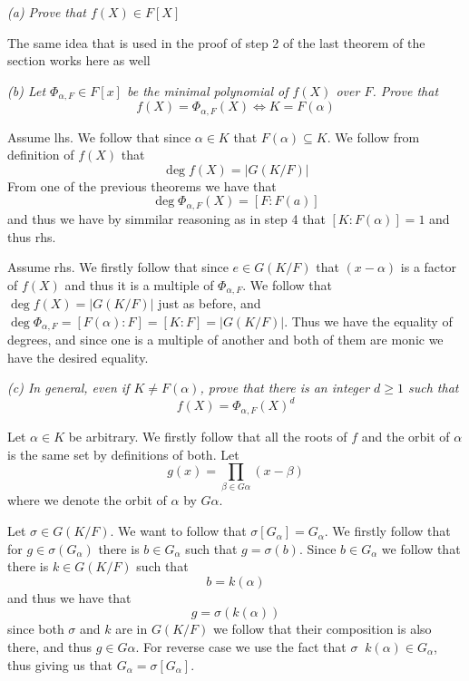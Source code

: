 \documentclass[11pt,oneside,titlepage]{book}
\DeclareMathOperator \inv {^{-1}}
\begin{document}
\textit{(a) Prove that $f(X) \in F[X]$}

The same idea that is used in the proof of step 2 of the last theorem
of the section works here as well

\textit{(b) Let $\Phi_{\alpha, F} \in F[x]$ be the minimal polynomial
  of $f(X)$ over $F$.  Prove that
  $$f(X) = \Phi_{\alpha, F}(X) \iff K = F(\alpha)$$
}

Assume lhs. We follow that since $\alpha \in K$ that $F(\alpha)
\subseteq K$. We follow from definition of $f(X)$ that
$$\deg f(X) = |G(K/F)|$$
From one of the previous theorems we have that
$$\deg \Phi_{\alpha, F}(X) = [F: F(a)]$$
 and thus we have by simmilar reasoning as in step 4 that
$[K:F(\alpha)] = 1$ and thus rhs.

Assume rhs. We firstly follow that since $e \in G(K/F)$ that $(x -
\alpha)$ is a factor of $f(X)$ and thus it is a multiple of
$\Phi_{\alpha, F}$. We follow that $\deg f(X) = |G(K/F)|$ just as
before, and $\deg \Phi_{\alpha, F} = [F(\alpha): F] = [K:F] =
|G(K/F)|$. Thus we have the equality of degrees, and since one is a
multiple of another and both of them are monic we have the desired
equality.

\textit{(c) In general, even if $K \neq F(\alpha)$, prove that there is an
  integer $d \geq 1$ such that
  $$f(X) = \Phi_{\alpha, F}(X)^d$$}

Let $\alpha \in K$ be arbitrary. We firstly follow that all the roots
of $f$ and the orbit of $\alpha$ is the same set by definitions of
both. Let
$$g(x) = \prod_{\beta \in G\alpha}{(x - \beta)}$$
where we denote the orbit of $\alpha$ by $G\alpha$.

Let $\sigma \in G(K/F)$. We want to follow that $\sigma[G_\alpha] =
G_\alpha$. We firstly follow that for $g \in \sigma(G_\alpha)$
there is $b \in G_\alpha$ such that $g = \sigma(b)$. Since $b \in G_\alpha$
we follow that there is $k \in G(K/F)$ such that
$$b = k(\alpha)$$
and thus we have that
$$g = \sigma(k(\alpha))$$
since both $\sigma$ and $k$ are in $G(K/F)$ we follow that their
composition is also there, and thus $g \in G\alpha$. For reverse
case we use the fact that $\sigma\inv k(\alpha) \in G_\alpha$, thus
giving us that $G_\alpha = \sigma [G_\alpha]$.
\end{document}
